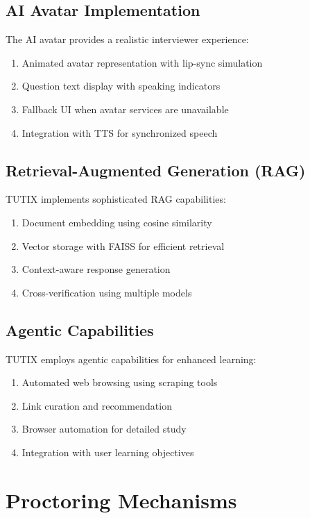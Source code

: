 \documentclass[12pt, conference]{IEEEtran}
\begin{document}
\subsection{AI Avatar Implementation}

The AI avatar provides a realistic interviewer experience:
\begin{enumerate}
    \item Animated avatar representation with lip-sync simulation
    \item Question text display with speaking indicators
    \item Fallback UI when avatar services are unavailable
    \item Integration with TTS for synchronized speech
\end{enumerate}

\subsection{Retrieval-Augmented Generation (RAG)}

TUTIX implements sophisticated RAG capabilities:
\begin{enumerate}
    \item Document embedding using cosine similarity
    \item Vector storage with FAISS for efficient retrieval
    \item Context-aware response generation
    \item Cross-verification using multiple models
\end{enumerate}

\subsection{Agentic Capabilities}

TUTIX employs agentic capabilities for enhanced learning:
\begin{enumerate}
    \item Automated web browsing using scraping tools
    \item Link curation and recommendation
    \item Browser automation for detailed study
    \item Integration with user learning objectives
\end{enumerate}

\section{Proctoring Mechanisms}
\end{document}
